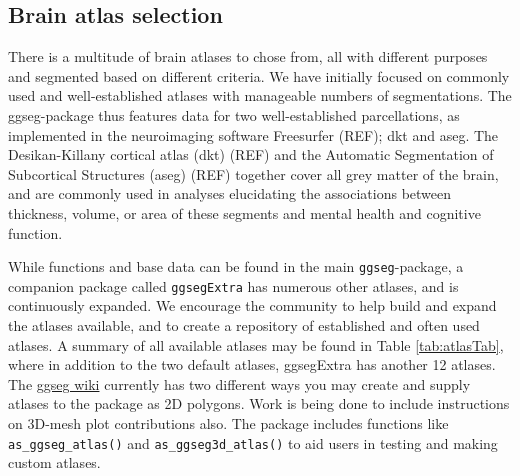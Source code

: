 \documentclass[fleqn,10pt]{wlpeerj} %
\begin{document}
\hypertarget{brain-atlas-selection}{%
\subsection{Brain atlas selection}\label{brain-atlas-selection}}

There is a multitude of brain atlases to chose from, all with different purposes and segmented based on different criteria.
We have initially focused on commonly used and well-established atlases with manageable numbers of segmentations.
The ggseg-package thus features data for two well-established parcellations, as implemented in the neuroimaging software Freesurfer (REF); dkt and aseg.
The Desikan-Killany cortical atlas (dkt) (REF) and the Automatic Segmentation of Subcortical Structures (aseg) (REF) together cover all grey matter of the brain, and are commonly used in analyses elucidating the associations between thickness, volume, or area of these segments and mental health and cognitive function.

While functions and base data can be found in the main \texttt{ggseg}-package, a companion package called \texttt{ggsegExtra} has numerous other atlases, and is continuously expanded.
We encourage the community to help build and expand the atlases available, and to create a repository of established and often used atlases.
A summary of all available atlases may be found in Table \ref{tab:atlasTab}, where in addition to the two default atlases, ggsegExtra has another 12 atlases.
The \href{https://github.com/LCBC-UiO/ggseg/wiki}{ggseg wiki} currently has two different ways you may create and supply atlases to the package as 2D polygons.
Work is being done to include instructions on 3D-mesh plot contributions also.
The package includes functions like \texttt{as\_ggseg\_atlas()} and \texttt{as\_ggseg3d\_atlas()} to aid users in testing and making custom atlases.
\end{document}
